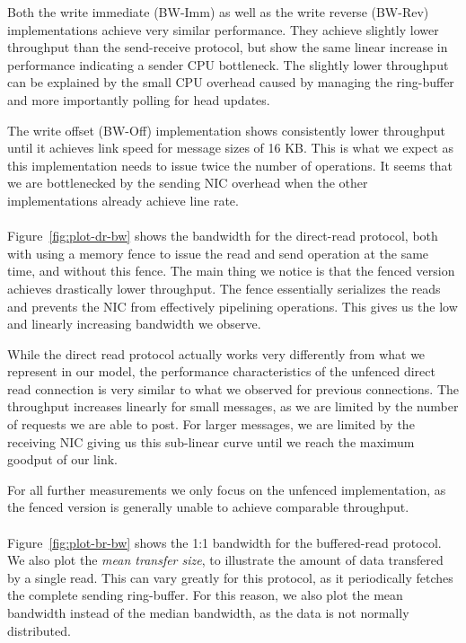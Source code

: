 Both the write immediate (BW-Imm) as well
as the write reverse (BW-Rev) implementations achieve very similar performance. They achieve slightly lower throughput
than the send-receive protocol, but show the same linear increase in performance indicating a sender CPU bottleneck. The
slightly lower throughput can be explained by the small CPU overhead caused by managing the ring-buffer and more importantly  
polling for head updates.

The write offset (BW-Off) implementation shows consistently lower throughput until it achieves
link speed for message sizes of 16 KB. This is what we expect as this implementation needs to issue 
twice the number of operations. It seems that we are bottlenecked by the sending NIC overhead when the other
implementations already achieve line rate.

\paragraph{} Figure~\ref{fig:plot-dr-bw} shows the bandwidth for the direct-read protocol, both with using a memory fence
to issue the read and send operation at the same time, and without this fence.  The main thing we notice is that the 
fenced version achieves drastically lower throughput. The fence essentially serializes the reads and prevents the NIC 
from effectively pipelining operations. This gives us the low and linearly increasing bandwidth we observe.

While the direct read protocol actually works very differently from what we represent in our model, the performance 
characteristics of the unfenced direct read connection is very similar to what we observed for previous connections. The
throughput increases linearly for small messages, as we are limited by the number of requests we are able to post. For larger
messages, we are limited by the receiving NIC giving us this sub-linear curve until we reach the maximum goodput of our link.

For all further measurements we only focus on the unfenced implementation, as the fenced version is generally unable
to achieve comparable throughput.


\paragraph{} Figure~\ref{fig:plot-br-bw} shows the 1:1 bandwidth for the buffered-read protocol. We also plot the 
\emph{mean transfer size}, to illustrate the amount of data transfered by a single read. 
This can vary greatly for this protocol, as it periodically
fetches the complete sending ring-buffer. For this reason, we also plot the mean bandwidth instead of the median bandwidth, 
as the data is not normally distributed.


